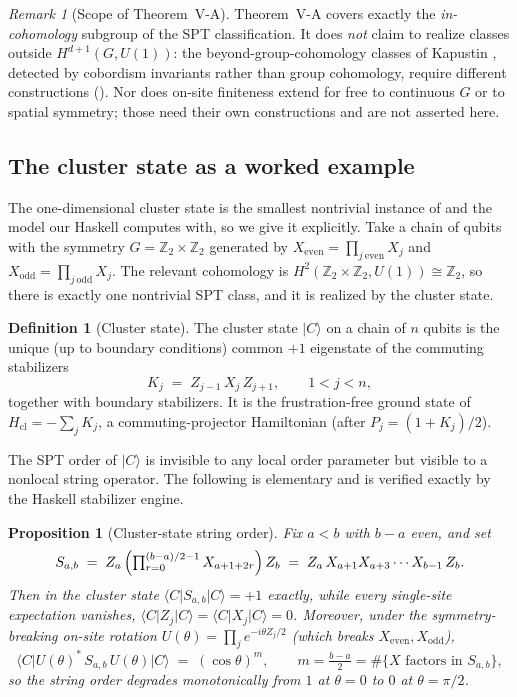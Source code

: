 \documentclass[12pt]{article}
\newcommand{\Ztwo}{\mathbb{Z}_2}
\newtheorem{proposition}[theorem]{Proposition}
\theoremstyle{definition}
\newtheorem{definition}[theorem]{Definition}
\theoremstyle{remark}
\newtheorem{remark}[theorem]{Remark}
\begin{document}
\begin{remark}[Scope of Theorem~V-A]
\label{rem:VAscope}
Theorem~V-A covers exactly the \emph{in-cohomology} subgroup of the SPT classification. It
does \emph{not} claim to realize classes outside $H^{d+1}(G,U(1))$: the beyond-group-cohomology
classes of Kapustin \cite{kapustin-cobordism}, detected by cobordism invariants rather than
group cohomology, require different constructions (). Nor does on-site
finiteness extend for free to continuous $G$ or to spatial symmetry; those need their own
constructions and are not asserted here.
\end{remark}

\subsection{The cluster state as a worked example}

The one-dimensional cluster state is the smallest nontrivial instance of  and
the model our Haskell computes with, so we give it explicitly. Take a chain of qubits with
the symmetry $G=\Ztwo\times\Ztwo$ generated by
$X_{\mathrm{even}}=\prod_{j\ \mathrm{even}}X_j$ and
$X_{\mathrm{odd}}=\prod_{j\ \mathrm{odd}}X_j$. The relevant cohomology is
$H^2(\Ztwo\times\Ztwo,U(1))\cong\Ztwo$, so there is exactly one nontrivial SPT class, and it
is realized by the cluster state.

\begin{definition}[Cluster state]
\label{def:cluster}
The cluster state $\lvert C\rangle$ on a chain of $n$ qubits is the unique (up to boundary
conditions) common $+1$ eigenstate of the commuting stabilizers
\[
  K_j \;=\; Z_{j-1}\,X_j\,Z_{j+1}, \qquad 1<j<n,
\]
together with boundary stabilizers. It is the frustration-free ground state of
$H_{\mathrm{cl}}=-\sum_j K_j$, a commuting-projector Hamiltonian (after $P_j=(1+K_j)/2$).
\end{definition}

The SPT order of $\lvert C\rangle$ is invisible to any local order parameter but visible to a
nonlocal string operator. The following is elementary and is verified exactly by the Haskell
stabilizer engine.

\begin{proposition}[Cluster-state string order]
\label{prop:cluster}
Fix $a<b$ with $b-a$ even, and set
\[
  S_{a,b} \;=\; Z_{a}\,\Bigl(\textstyle\prod_{r=0}^{(b-a)/2-1} X_{a+1+2r}\Bigr)\,Z_{b}
  \;=\; Z_a\,X_{a+1}X_{a+3}\cdots X_{b-1}\,Z_b .
\]
Then in the cluster state $\langle C\rvert S_{a,b}\lvert C\rangle = +1$ exactly, while every
single-site expectation vanishes, $\langle C\rvert Z_j\lvert C\rangle=\langle C\rvert
X_j\lvert C\rangle=0$. Moreover, under the symmetry-breaking on-site rotation
$U(\theta)=\prod_j e^{-i\theta Z_j/2}$ (which breaks $X_{\mathrm{even}},X_{\mathrm{odd}}$),
\[
  \langle C\rvert U(\theta)^\ast\,S_{a,b}\,U(\theta)\lvert C\rangle \;=\; (\cos\theta)^{m},
  \qquad m=\tfrac{b-a}{2} = \#\{\text{$X$ factors in }S_{a,b}\},
\]
so the string order degrades monotonically from $1$ at $\theta=0$ to $0$ at
$\theta=\pi/2$.
\end{proposition}
\end{document}

